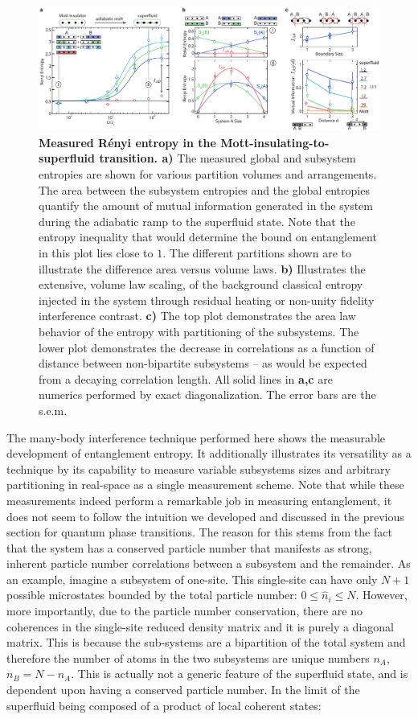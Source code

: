 \begin{figure}[t!]
		\includegraphics[width=\columnwidth]{figures/ch3/sf_mi_data/fig5.pdf} 
		\caption{\textbf{Measured R\'enyi entropy in the Mott-insulating-to-superfluid transition. a)}  The measured global and subsystem entropies are shown for various partition volumes and arrangements. The area between the subsystem entropies and the global entropies quantify the amount of mutual information generated in the system during the adiabatic ramp to the superfluid state. Note that the entropy inequality that would determine the bound on entanglement in this plot lies close to $1$. The different partitions shown are to illustrate the difference area versus volume laws. \textbf{b)} Illustrates the extensive, volume law scaling, of the background classical entropy injected in the system through residual heating or non-unity fidelity interference contrast. \textbf{c)} The top plot demonstrates the area law behavior of the entropy with partitioning of the subsystems. The lower plot demonstrates the decrease in correlations as a function of distance between non-bipartite subsystems -- as would be expected from a decaying correlation length.  All solid lines in \textbf{a,c} are numerics performed by exact diagonalization. The error bars are the s.e.m. }
		\label{fig:sf_mi_fig}	
\end{figure}

The many-body interference technique performed here shows the measurable development of entanglement entropy. It additionally illustrates its versatility as a technique by its capability to measure variable subsystems sizes and arbitrary partitioning in real-space as a single measurement scheme. Note that while these measurements indeed perform a remarkable job in measuring entanglement, it does not seem to follow the intuition we developed and discussed in the previous section for quantum phase transitions. The reason for this stems from the fact that the system has a conserved particle number that manifests as strong, inherent particle number correlations between a subsystem and the remainder. As an example, imagine a subsystem of one-site. This single-site can have only $N+1$ possible microstates bounded by the total particle number: $0\leq \hat{n}_i \leq N$. However, more importantly, due to the particle number conservation, there are no coherences in the single-site reduced density matrix and it is purely a diagonal matrix. This is because the sub-systems are a bipartition of the total system and therefore the number of atoms in the two subsystems are unique numbers $n_A$, $n_B = N-n_A$. This is actually not a generic feature of the superfluid state, and is dependent upon having a conserved particle number. In the limit of the superfluid being composed of a product of local coherent states:

